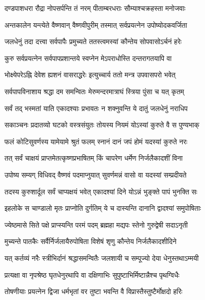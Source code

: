 \twolineshloka
{दण्डपाशधरा रौद्रा नोपसर्पन्ति तं नरम्}
{पीताम्बरधराः सौम्याश्चक्रहस्ता मनोजवाः}%

\twolineshloka
{अन्तकालेन यन्त्येते वैष्णवान् वैष्णवीपुरीम्}
{तस्मात् सर्वप्रयत्नेन उपोष्योदकवर्जिता}%

\twolineshloka
{जलधेनुं तदा दत्त्वा सर्वपापैः प्रमुच्यते}
{ततस्त्वमस्यां कौन्तेय सोपवासोऽर्चनं हरेः}%

\twolineshloka
{कुरु सर्वप्रयत्नेन सर्वपापप्रशान्तये}
{स्वप्नेन मेऽपराधोस्ति दन्तरागतयापि वा}%

\twolineshloka
{भोक्ष्येपरेऽह्नि देवेश ह्यशनं वासराद्धरेः}
{इत्युच्चार्य ततो मन्त्र उपवासपरो भवेत्}%

\twolineshloka
{सर्वपापविनाशाय श्रद्धा दम समन्वितः}
{मेरुमन्दरमात्राघं स्त्रिया पुंसा च यत् कृतम्}%

\twolineshloka
{सर्वं तद् भस्मतां याति एकादश्याः प्रभावतः}
{न शक्नुवन्ति ये दातुं जलधेनुं नराधिप}%

\twolineshloka
{सकाञ्चनः प्रदातव्यो घटको वस्त्रसंयुतः}
{तोयस्य नियमं योऽस्यां कुरुते वै स पुण्यभाक्}%

\twolineshloka
{फलं कोटिसुवर्णस्य यामेयामे श्रुतं फलम्}
{स्नानं दानं जपं होमं यदस्यां कुरुते नरः}%

\twolineshloka
{तत् सर्वं चाक्षयं प्राप्तमेतत्कृष्णप्रभाषितम्}
{किं चापरेण धर्मेण निर्जलैकादशीं विना}%

\twolineshloka
{उपोष्य सम्यग् विधिवद् वैष्णवं पदमाप्नुयात्}
{सुवर्णमन्नं वासो वा यदस्यां सम्प्रदीयते}%

\twolineshloka
{तदस्य कुरुशार्दूल सर्वं चाप्यक्षयं भवेत्}
{एकादश्यां दिने योऽन्नं भुङ्क्ते पापं भुनक्ति सः}%

\twolineshloka
{इहलोके स चाण्डालो मृतः प्राप्नोति दुर्गतिम्}
{ये च दास्यन्ति दानानि द्वादश्यां समुपोषिताः}%

\twolineshloka
{ज्येष्ठमासे सिते पक्षे प्राप्स्यन्ति परमं पदम्}
{ब्रह्महा मद्यपः स्तेनो गुरुद्वेषी सदाऽनृती}%

\twolineshloka
{मुच्यन्ते पातकैः सर्वैर्निर्जलायैरुपोषिता}
{विशेषं शृणु कौन्तेय निर्जलैकादशीदिने}%

\twolineshloka
{यत् कर्तव्यं नरैः स्त्रीभिर्दानं श्रद्धासमन्वितैः}
{जलशायी च सम्पूज्यो देया धेनुस्तथाऽम्मयी}%

\twolineshloka
{प्रत्यक्षा वा नृपश्रेष्ठ घृतधेनुरथापि वा}
{दक्षिणाभिः सुपुष्टाभिर्मिष्टान्नैश्च पृथग्विधैः}%

\twolineshloka
{तोषणीयाः प्रयत्नेन द्विजा धर्मभृतां वर}
{तुष्टा भवन्ति वै विप्रास्तैस्तुष्टैर्मोक्षदो हरिः}%

